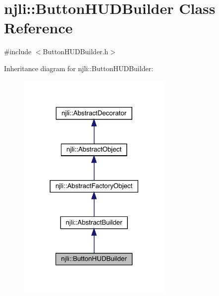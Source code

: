 \hypertarget{classnjli_1_1_button_h_u_d_builder}{}\section{njli\+:\+:Button\+H\+U\+D\+Builder Class Reference}
\label{classnjli_1_1_button_h_u_d_builder}


{\ttfamily \#include $<$Button\+H\+U\+D\+Builder.\+h$>$}



Inheritance diagram for njli\+:\+:Button\+H\+U\+D\+Builder\+:\nopagebreak
\begin{figure}[H]
\begin{center}
\leavevmode
\includegraphics[width=213pt]{classnjli_1_1_button_h_u_d_builder__inherit__graph}
\end{center}
\end{figure}


